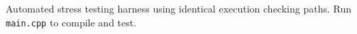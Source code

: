
Automated stress testing harness using identical execution checking paths. Run \lstinline|main.cpp| to compile and test.




